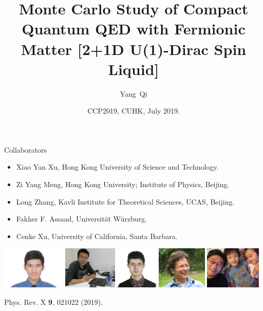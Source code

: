 \documentclass[xcolor=table, 10pt, aspectratio=169]{beamer}
\title[U1SL] %
{Monte Carlo Study of Compact Quantum QED with Fermionic Matter [2+1D U(1)-Dirac Spin Liquid]}
\author[Y Qi] %
{Yang~Qi}
\institute[Fudan] %
{
Department of Physics, Fudan University.
}
\date{CCP2019, CUHK, July 2019.}
\begin{document}
\begin{frame}
  \titlepage
\end{frame}

\begin{frame}{Collaborators}
\begin{itemize}
\item Xiao Yan Xu, Hong Kong University of Science and Technology.
\item Zi Yang Meng, Hong Kong University; Institute of Physics, Beijing.
\item Long Zhang, Kavli Institute for Theoretical Sciences, UCAS, Beijing.
\item Fakher F. Assaad, Universit\"at W\"urzburg.
\item Cenke Xu, University of California, Santa Barbara.
\end{itemize}
\begin{center}
  \includegraphics[height=2cm]{../people/xiaoyanxu}
  \includegraphics[height=2cm]{../people/ziyangmeng}
  \includegraphics[height=2cm]{../people/zhanglong}
  \includegraphics[height=2cm]{../people/fakher}
  \includegraphics[height=2cm]{../people/cenke}
\end{center}
\begin{center}
  \small Phys. Rev. X \textbf{9}, 021022 (2019).
\end{center}
\end{frame}
\end{document}
